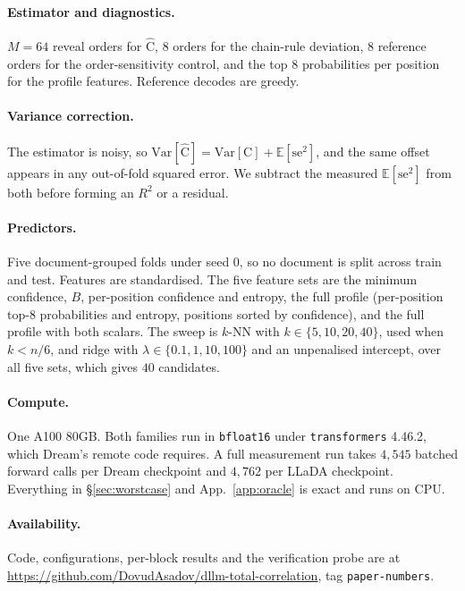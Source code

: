 \documentclass{article}
\newcommand{\C}{\mathrm{C}}
\newcommand{\Chat}{\widehat{\C}}
\begin{document}
\paragraph{Estimator and diagnostics.} $M{=}64$ reveal orders for $\Chat$, $8$ orders for
the chain-rule deviation, $8$ reference orders for the order-sensitivity control, and the
top $8$ probabilities per position for the profile features. Reference decodes are
greedy.

\paragraph{Variance correction.} The estimator is noisy, so
$\mathrm{Var}[\Chat]=\mathrm{Var}[\C]+\mathbb{E}[\mathrm{se}^2]$, and the same offset
appears in any out-of-fold squared error. We subtract the measured
$\mathbb{E}[\mathrm{se}^2]$ from both before forming an $R^2$ or a residual.

\paragraph{Predictors.} Five document-grouped folds under seed $0$, so no document is
split across train and test. Features are standardised. The five feature sets are the
minimum confidence, $B$, per-position confidence and entropy, the full profile
(per-position top-$8$ probabilities and entropy, positions sorted by confidence), and the
full profile with both scalars. The sweep is $k$-NN with $k\in\{5,10,20,40\}$, used when
$k<n/6$, and ridge with $\lambda\in\{0.1,1,10,100\}$ and an unpenalised intercept, over
all five sets, which gives $40$ candidates.

\paragraph{Compute.} One A100 80GB. Both families run in \texttt{bfloat16} under
\texttt{transformers} 4.46.2, which Dream's remote code requires. A full measurement run
takes $4{,}545$ batched forward calls per Dream checkpoint and $4{,}762$ per LLaDA
checkpoint. Everything in
\S\ref{sec:worstcase} and App.~\ref{app:oracle} is exact and runs on CPU.

\paragraph{Availability.} Code, configurations, per-block results and the verification probe are at
\url{https://github.com/DovudAsadov/dllm-total-correlation}, tag \texttt{paper-numbers}.
\end{document}

